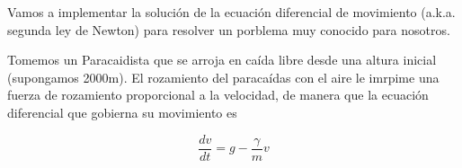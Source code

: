 Vamos a implementar la solución de la ecuación diferencial de movimiento 
(a.k.a. segunda ley de Newton) para resolver un porblema muy conocido para 
nosotros. 

Tomemos un Paracaidista que se arroja en caída libre desde una altura inicial (supongamos 2000m).
El rozamiento del paracaídas con el aire le imrpime una fuerza de rozamiento proporcional 
a la velocidad, de manera que la ecuación diferencial que gobierna su movimiento es

\begin{equation}
  \dfrac{ d v }{dt} = g - \dfrac{\gamma}{m} v
  \label{EqnEDO1}
\end{equation}


